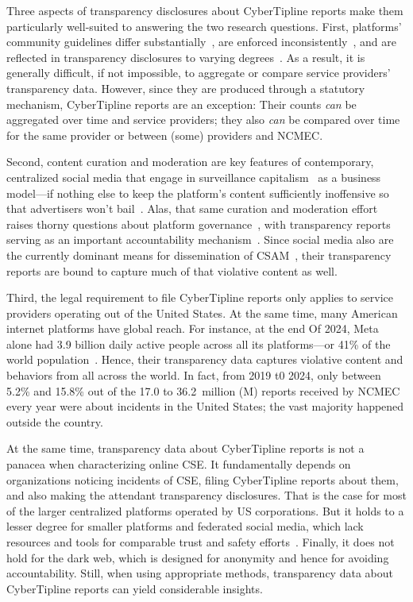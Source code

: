 \documentclass[anonymous,nonacm,screen,12pt]{acmart}
\newcommand\V[1]{{#1}}
\newcommand\V[1]{\textsc{\MakeLowercase{#1}}}
\theoremstyle{definition}
\begin{document}
Three aspects of transparency disclosures about CyberTipline reports make them
particularly well-suited to answering the two research questions. First,
platforms' community guidelines differ
substantially~\cite{BatemanThompsonea2021,JiangMiddlerea2020}, are enforced
inconsistently~\cite{Common2020,DiazHechtFelella2021}, and are reflected in
transparency disclosures to varying degrees~\cite{UrmanMakhortykh2023}. As a
result, it is generally difficult, if not impossible, to aggregate or compare
service providers' transparency data. However, since they are produced through a
statutory mechanism, CyberTipline reports are an exception: Their counts
\emph{can} be aggregated over time and service providers; they also \emph{can}
be compared over time for the same provider or between (some) providers and
\V{NCMEC}.

Second, content curation and moderation are key features of contemporary,
centralized social media that engage in surveillance
capitalism~\cite{Zuboff2019} as a business model---if nothing else to keep the
platform's content sufficiently inoffensive so that advertisers won't
bail~\cite{Masnick2022a,Patel2022a}. Alas, that same curation and moderation
effort raises thorny questions about platform governance~\cite{Klonick2018},
with transparency reports serving as an important accountability
mechanism~\cite{AccessNowACLUFoundationOfNorthernCaliforniaea2021,
EuropeanParliamentAndCouncil2022}. Since social media also are the currently
dominant means for dissemination of \V{CSAM}~\cite{SteelNewmanea2020}, their
transparency reports are bound to capture much of that violative content as
well.

Third, the legal requirement to file CyberTipline reports only applies to
service providers operating out of the United States. At the same time, many
American internet platforms have global reach. For instance, at the end Of 2024,
Meta alone had 3.9 billion daily active people across all its platforms---or
41\% of the world population~\cite{MetaPlatformsInc2025}. Hence, their
transparency data captures violative content and behaviors from all across the
world. In fact, from 2019 t0 2024, only between 5.2\% and 15.8\% out of the 17.0
to 36.2~million (\V{M}) reports received by \V{NCMEC} every year were about
incidents in the United States; the vast majority happened outside the country.

At the same time, transparency data about CyberTipline reports is not a panacea
when characterizing online \V{CSE}. It fundamentally depends on organizations
noticing incidents of \V{CSE}, filing CyberTipline reports about them, and also
making the attendant transparency disclosures. That is the case for most of the
larger centralized platforms operated by \V{US} corporations. But it holds to a
lesser degree for smaller platforms and federated social media, which lack
resources and tools for comparable trust and safety efforts~\cite{RothLai2024}.
Finally, it does not hold for the dark web, which is designed for anonymity and
hence for avoiding accountability. Still, when using appropriate methods,
transparency data about CyberTipline reports can yield considerable insights.
\end{document}
